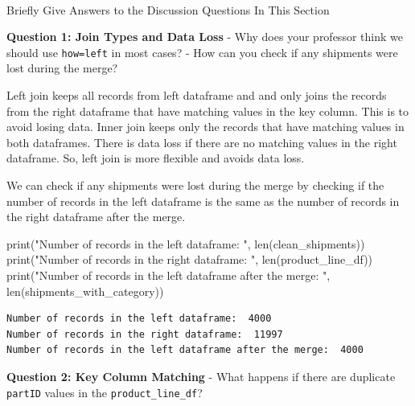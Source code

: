 \documentclass[
]{article}
\makeatletter
\let\oldparagraph\paragraph
\renewcommand{\paragraph}{
    \@ifstar
      \xxxParagraphStar
      \xxxParagraphNoStar
  }
\newcommand{\xxxParagraphStar}[1]{\oldparagraph*{#1}\mbox{}}
\newcommand{\xxxParagraphNoStar}[1]{\oldparagraph{#1}\mbox{}}
\newenvironment{Shaded}{\begin{snugshade}}{\end{snugshade}}
\newcommand{\BuiltInTok}[1]{\textcolor[rgb]{0.00,0.23,0.31}{#1}}
\newcommand{\NormalTok}[1]{\textcolor[rgb]{0.00,0.23,0.31}{#1}}
\newcommand{\StringTok}[1]{\textcolor[rgb]{0.13,0.47,0.30}{#1}}
\makeatother
\begin{document}
\paragraph{Briefly Give Answers to the Discussion Questions In This
Section}\label{briefly-give-answers-to-the-discussion-questions-in-this-section-5}

\textbf{Question 1: Join Types and Data Loss} - Why does your professor
think we should use
\texttt{how=\textquotesingle{}left\textquotesingle{}} in most cases? -
How can you check if any shipments were lost during the merge?

Left join keeps all records from left dataframe and and only joins the
records from the right dataframe that have matching values in the key
column. This is to avoid losing data. Inner join keeps only the records
that have matching values in both dataframes. There is data loss if
there are no matching values in the right dataframe. So, left join is
more flexible and avoids data loss.

We can check if any shipments were lost during the merge by checking if
the number of records in the left dataframe is the same as the number of
records in the right dataframe after the merge.

\label{join-types-and-data-loss}
\begin{Shaded}
\begin{Highlighting}[]
\BuiltInTok{print}\NormalTok{(}\StringTok{"Number of records in the left dataframe: "}\NormalTok{, }\BuiltInTok{len}\NormalTok{(clean\_shipments))}
\BuiltInTok{print}\NormalTok{(}\StringTok{"Number of records in the right dataframe: "}\NormalTok{, }\BuiltInTok{len}\NormalTok{(product\_line\_df))}
\BuiltInTok{print}\NormalTok{(}\StringTok{"Number of records in the left dataframe after the merge: "}\NormalTok{, }\BuiltInTok{len}\NormalTok{(shipments\_with\_category))}
\end{Highlighting}
\end{Shaded}

\begin{verbatim}
Number of records in the left dataframe:  4000
Number of records in the right dataframe:  11997
Number of records in the left dataframe after the merge:  4000
\end{verbatim}

\textbf{Question 2: Key Column Matching} - What happens if there are
duplicate \texttt{partID} values in the \texttt{product\_line\_df}?
\end{document}
